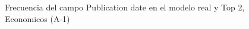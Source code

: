 \begin{figure}[H]
    \centering
    
    \caption{Frecuencia del campo Publication date en el modelo real y Top 2, Economicos (A-1)}
    \label{frecuency-Publication Date-top2}
\end{figure}